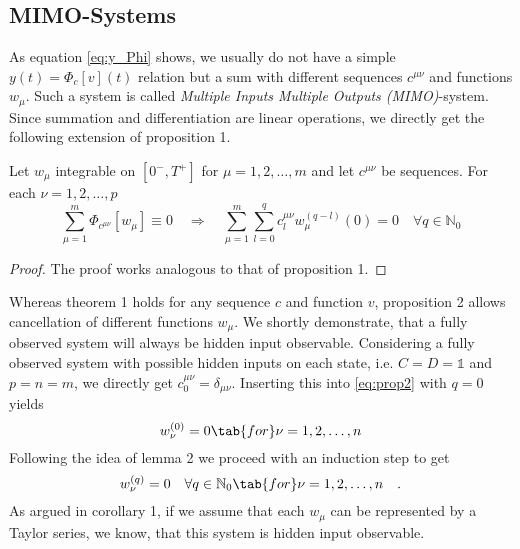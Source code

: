 \subsection{MIMO-Systems}
As equation \eqref{eq:y_Phi} shows, we usually do not have a simple $y(t)=\Phi_c[v](t)$ 
relation but a sum with different sequences $c^{\mu\nu}$ and functions $w_\mu$.
Such a system is called \textit{Multiple Inputs Multiple Outputs (MIMO)}-system.
Since summation and differentiation are linear operations, we directly get the following 
extension of proposition 1.
\begin{proposition}{}{}
	Let $w_\mu$ integrable on $[0^-,T^+]$ for $\mu=1,2,\ldots , m$ and let 
	$c^{\mu\nu}$ be sequences. For each $\nu=1,2,\ldots, p$
	\begin{equation}
	\sum\limits_{\mu=1}^m \Phi_{c^{\mu\nu}}[w_\mu] \equiv 0 \quad \Rightarrow \quad 
	\sum\limits_{\mu=1}^m\sum\limits_{l=0}^q c^{\mu\nu}_l w_\mu^{(q-l)}(0) = 0 \quad 
	\forall q \in \mathbb{N}_0 \tag{$\star\star$} \label{eq:prop2}
 	\end{equation}
\end{proposition}
\begin{proof}
	The proof works analogous to that of proposition 1.
\end{proof}

Whereas theorem 1 holds for any sequence $c$ and function $v$, proposition 2 allows 
cancellation of different functions $w_\mu$. We shortly demonstrate, that a fully 
observed system will always be hidden input observable.
Considering a fully observed system with possible hidden inputs on each state, i.e. 
$C=D=\mathbb{1}$ and $p=n=m$, we directly get $c_0^{\mu\nu}=\delta_{\mu\nu}$. 
Inserting this into 
\eqref{eq:prop2} with $q=0$ yields 
\begin{equation}
w_\nu^{(0)} = 0 \tab{for} \nu = 1,2,\ldots , n
\end{equation}
Following the idea of lemma 2 we proceed with an induction step to get
\begin{equation}
w_\nu^{(q)} = 0 \quad \forall q\in\mathbb{N}_0 \tab{for} \nu = 1,2,\ldots , n \quad .
\end{equation}
As argued in corollary 1, if we assume that each $w_\mu$ can be represented by a 
Taylor series, we know, that this system is hidden input observable. \\

